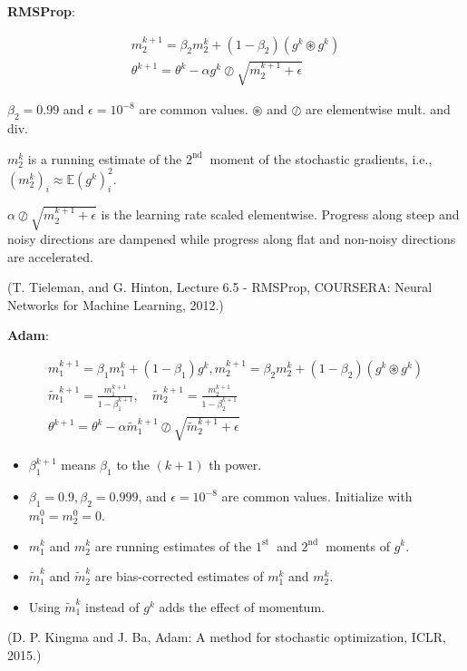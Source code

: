 \begin{definition}[6.20][RMSProp]
    \textbf{RMSProp}:

    $$
    \begin{gathered}
    m_{2}^{k+1}=\beta_{2} m_{2}^{k}+\left(1-\beta_{2}\right)\left(g^{k} \circledast g^{k}\right) \\
    \theta^{k+1}=\theta^{k}-\alpha g^{k} \oslash \sqrt{m_{2}^{k+1}+\epsilon}
    \end{gathered}
    $$

    $\beta_{2}=0.99$ and $\epsilon=10^{-8}$ are common values. $\circledast$ and $\oslash$ are elementwise mult. and div.

    $m_{2}^{k}$ is a running estimate of the $2^{\text {nd }}$ moment of the stochastic gradients, i.e., $\left(m_{2}^{k}\right)_{i} \approx \mathbb{E}\left(g^{k}\right)_{i}^{2}$.

    $\alpha \oslash \sqrt{m_{2}^{k+1}+\epsilon}$ is the learning rate scaled elementwise. Progress along steep and noisy directions are dampened while progress along flat and non-noisy directions are accelerated.

    (T. Tieleman, and G. Hinton, Lecture 6.5 - RMSProp, COURSERA: Neural Networks for Machine Learning, 2012.)
\end{definition}

\begin{definition}
    \textbf{Adam}:

    $$
    \begin{gathered}
    m_{1}^{k+1}=\beta_{1} m_{1}^{k}+\left(1-\beta_{1}\right) g^{k}, m_{2}^{k+1}=\beta_{2} m_{2}^{k}+\left(1-\beta_{2}\right)\left(g^{k} \circledast g^{k}\right) \\
    \tilde{m}_{1}^{k+1}=\frac{m_{1}^{k+1}}{1-\beta_{1}^{k+1}}, \quad \widetilde{m}_{2}^{k+1}=\frac{m_{2}^{k+1}}{1-\beta_{2}^{k+1}} \\
    \theta^{k+1}=\theta^{k}-\alpha \widetilde{m}_{1}^{k+1} \oslash \sqrt{\widetilde{m}_{2}^{k+1}+\epsilon}
    \end{gathered}
    $$

    \begin{itemize}
        \item $\beta_{1}^{k+1}$ means $\beta_{1}$ to the $(k+1)$ th power.
        \item $\beta_{1}=0.9, \beta_{2}=0.999$, and $\epsilon=10^{-8}$ are common values. Initialize with $m_{1}^{0}=m_{2}^{0}=0$.
        \item $m_{1}^{k}$ and $m_{2}^{k}$ are running estimates of the $1^{\text {st }}$ and $2^{\text {nd }}$ moments of $g^{k}$.
        \item $\tilde{m}_{1}^{k}$ and $\tilde{m}_{2}^{k}$ are bias-corrected estimates of $m_{1}^{k}$ and $m_{2}^{k}$.
        \item Using $\widetilde{m}_{1}^{k}$ instead of $g^{k}$ adds the effect of momentum.
    \end{itemize}

    (D. P. Kingma and J. Ba, Adam: A method for stochastic optimization, ICLR, 2015.)
\end{definition}


